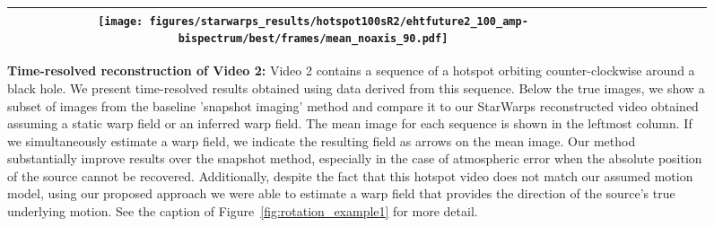 \begin{figure}
\begin{center}
\begin{tabular}{  c | c | c  c  c  c  c c }
			\texttt{[image: figures/starwarps\_results/hotspot100sR2/ehtfuture2\_100\_amp-bispectrum/best/frames/mean\_noaxis\_90.pdf]}  
			\\ \hline  	
		\end{tabular}
		\caption{{\bf Time-resolved reconstruction of Video 2:} Video 2 contains a sequence of a hotspot orbiting counter-clockwise around a black hole. We present time-resolved results obtained using data derived from this sequence. 
			Below the true images, we show a subset of images from the baseline 'snapshot imaging' method and compare it to our StarWarps reconstructed video obtained assuming a static warp field or an inferred warp field. The mean image for each sequence is shown in the leftmost column. If we simultaneously estimate a warp field, we indicate the resulting field as arrows on the mean image. 
			Our method substantially improve results over the snapshot method, especially in the case of atmospheric error when the absolute position of the source cannot be recovered. 
			Additionally, despite the fact that this hotspot video does not match our assumed motion model, using our proposed approach we were able to estimate a warp field that provides the direction of the source's true underlying motion. See the caption of Figure~\ref{fig:rotation_example1} for more detail. }
		\label{fig:rotation_example2}
	\end{center}
\end{figure}


